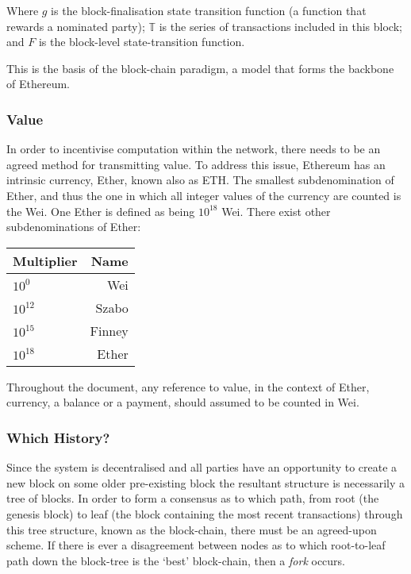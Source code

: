 \documentclass[9pt,oneside]{amsart}
\begin{document}
\begin{multicols}{2}
Where $g$ is the block-finalisation state transition function (a function that rewards a nominated party); $\mathbb{T}$ is the series of transactions included in this block; and $F$ is the block-level state-transition function.

This is the basis of the block-chain paradigm, a model that forms the backbone of Ethereum.

\subsubsection{Value}

In order to incentivise computation within the network, there needs to be an agreed method for transmitting value. To address this issue, Ethereum has an intrinsic currency, Ether, known also as ETH. The smallest subdenomination of Ether, and thus the one in which all integer values of the currency are counted is the Wei. One Ether is defined as being $10^{18}$ Wei. There exist other subdenominations of Ether:

\par\bigskip
\begin{center}
\begin{tabular}{lr}
\toprule
Multiplier & Name \\
\midrule
$10^0$ & Wei \\
$10^{12}$ & Szabo \\
$10^{15}$ & Finney \\
$10^{18}$ & Ether \\
\bottomrule
\end{tabular}
\end{center}
\par

Throughout the document, any reference to value, in the context of Ether, currency, a balance or a payment, should assumed to be counted in Wei. 

\subsubsection{Which History?}

Since the system is decentralised and all parties have an opportunity to create a new block on some older pre-existing block the resultant structure is necessarily a tree of blocks. In order to form a consensus as to which path, from root (the genesis block) to leaf (the block containing the most recent transactions) through this tree structure, known as the block-chain, there must be an agreed-upon scheme. If there is ever a disagreement between nodes as to which root-to-leaf path down the block-tree is the `best' block-chain, then a \textit{fork} occurs.


\end{multicols}
\end{document}
